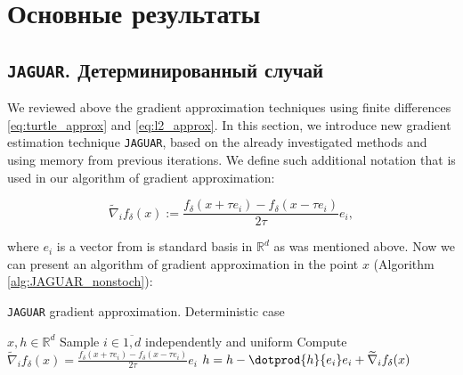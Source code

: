 \section{Основные результаты}

\subsection{\texttt{JAGUAR}. Детерминированный случай} \label{subsection:JAGUAR_nonstoch}
    
        We reviewed above the gradient approximation techniques using finite differences \eqref{eq:turtle_approx} and \eqref{eq:l2_approx}. In this section, we introduce new gradient estimation technique \texttt{JAGUAR}, based on the already investigated methods and using memory from previous iterations. We define such additional notation that is used in our algorithm of gradient approximation:

        \begin{equation}\label{eq:opf_nonstoch}
            \widetilde{\nabla}_if_\delta(x) :=  \dfrac{f_\delta(x + \tau e_i) - f_\delta(x - \tau e_i)}{2 \tau} e_i,
        \end{equation}



        where $e_i$ is a vector from is standard basis in $\mathbb{R}^d$ as was mentioned above. Now we can present an algorithm of gradient approximation in the point $x$ (Algorithm \ref{alg:JAGUAR_nonstoch}):

        \begin{algorithm}[H]
    	\caption{\texttt{JAGUAR} gradient approximation. Deterministic case}
    	\label{alg:JAGUAR_nonstoch}
        \begin{algorithmic}[1]
             $x, h \in \mathbb{R}^d$ \label{line:0}
            \State Sample $i \in \overline{1, d}$ independently and uniform
            \State Compute $\widetilde{\nabla}_i f_{\delta}(x) = \frac{f_{\delta}(x + \tau e_i) - f_{\delta}(x - \tau e_i)}{2 \tau} e_i$
            \State $h = h - \dotprod{h}{e_i} e_i + \widetilde{\nabla}_i f_{\delta}(x)$ \label{line:h^k_nonstoch}
        \end{algorithmic}
        \end{algorithm}




